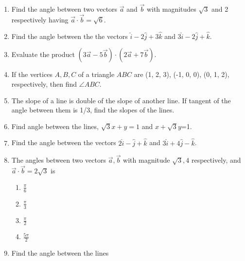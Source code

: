 \begin{enumerate}[label=\thesubsection.\arabic*, ref=\thesubsection.\theenumi]
\item Find the angle between two vectors $\overrightarrow{a}$ and $\overrightarrow {b} $ with magnitudes $\sqrt{3}$ and 2 respectively having $\overrightarrow {a}\cdot\overrightarrow {b}=\sqrt{6}$.
		\label{prob:12/10/3/1/inner}
	\\
	\solution
		
\item Find the angle between the the vectors $\hat{i}-2\hat{j}+3\hat{k}$ and $3\hat{i}-2\hat{j}+\hat{k}$.
	\\
	\solution
		
\item Evaluate the product $(3\overrightarrow {a}-5\overrightarrow {b})\cdot (2\overrightarrow {a}+7\overrightarrow {b})$.
	\\
	\solution
		
\item If the vertices $A, B, C$ of a triangle $ABC$ are (1, 2, 3),  (-1, 0, 0),  (0, 1, 2),  respectively,  then find  $\angle{ABC}$.
	\\
	\solution
		
	\item The slope of a line is double of the slope of another line. If tangent of the angle between them is 1/3,  find the slopes of the lines.
\label{chapters/11/10/1/11}
\\
\solution 

\item    Find angle between the lines,  $\sqrt{3}x+y=1$ and $x+\sqrt{3}y$=1.
\label{chapters/11/10/3/9}
\\
   \solution 

\item Find the angle between the vectors $2\hat{i}-\hat{j}+\hat{k}$ and $3\hat{i}+4\hat{j}-\hat{k}$.
\item The angles between two vectors $\vec{a},  \vec{b}$ with magnitude $\sqrt{3},  4$ respectively,  and $\vec{a} \cdot \vec{b}= 2\sqrt{3}$ is
	\begin{enumerate}
\item $\frac{\pi}{6}$
\item $\frac{\pi}{3}$
\item $\frac{\pi}{2}$ 
\item $\frac{5\pi}{2}$
\end{enumerate}
\item Find the angle between the lines 
\begin{align}

\end{align}
\end{enumerate}
